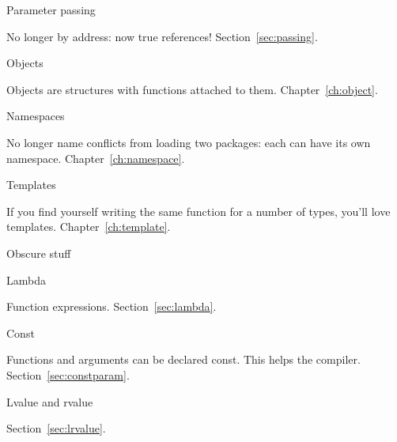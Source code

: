  {Parameter passing}

No longer by address: now true references! Section~\ref{sec:passing}.

 {Objects}

Objects are structures with functions attached to
them. Chapter~\ref{ch:object}.

 {Namespaces}

No longer name conflicts from loading two packages: each can have its
own namespace. Chapter~\ref{ch:namespace}.

 {Templates}

If you find yourself writing the same function for a number of types,
you'll love templates. Chapter~\ref{ch:template}.

 {Obscure stuff}

 {Lambda}

Function expressions.
Section~\ref{sec:lambda}.

 {Const}

Functions and arguments can be declared const. This helps the
compiler. Section~\ref{sec:constparam}.

 {Lvalue and rvalue}

Section~\ref{sec:lrvalue}.

\endinput

You’ll have no destructors, so cleanup is manual. This is most fun
with early-return functions, but it can keep you entertained for all
cases. File handles, memory, and other resources (thread locks,
anyone) are all waiting patiently and silently for you to forget them.

Initialization has be be explicitly called. No constructors either.

Want inheritance? Sure. Write your own vtable (often done with function pointers in a struct).
Instead of templates, you’ll need to abandon type safety and cast back and forth to (void*). Don’t explicitly cast to (void *), because the compiler never warns about explicit or implicit casts to and from (void *).

You’ll also need to make sure you’re using the right library calls - snprintf versus sprintf etc. Hopefully an existing project will be using the right ones.

On the plus side, you’re moving to Linux, and a lot of the tooling available is - while very command-line oriented - very good indeed.

For an IDE, I’d recommend CLion from JetBrains, but I’m told that with sufficient patience, Atom can be encouraged into doing useful stuff.

You’ll find that while the command-line of GDB, the debugger, isn’t very easy to learn to begin with, it’s very powerful, allowing you to do conditional breakpoints with comparative ease.

Valgrind is amazing. Voodoo. It’ll find uninitialized memory, allocation errors, overflows, and leaks - all common and hard to debug issues in C.

The CLang static analyzer is pretty impressive, too.

(copied from
\url{https://www.quora.com/How-should-a-C++-programmer-learn-Linux-C/answer/Dave-Cridland})
